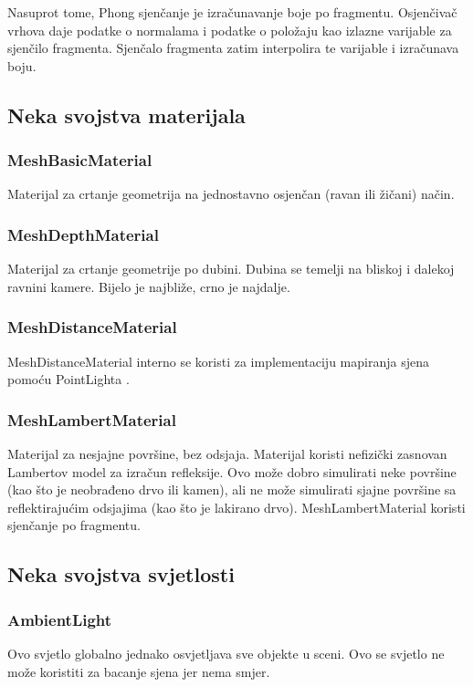 \documentclass[a4paper,12pt]{article}
\begin{document}
Nasuprot tome, Phong sjenčanje je izračunavanje boje po fragmentu. 
Osjenčivač vrhova daje podatke o normalama i podatke o položaju kao izlazne varijable za sjenčilo fragmenta. 
Sjenčalo fragmenta zatim interpolira te varijable i izračunava boju.

\subsection*{Neka svojstva materijala}
\subsubsection*{MeshBasicMaterial}

\hspace{10mm} Materijal za crtanje geometrija na jednostavno osjenčan (ravan ili žičani) način.

\subsubsection*{MeshDepthMaterial}
\hspace{10mm} Materijal za crtanje geometrije po dubini. Dubina se temelji na bliskoj i dalekoj ravnini kamere. Bijelo je najbliže, crno je najdalje.

\subsubsection*{MeshDistanceMaterial}
\hspace{10mm} MeshDistanceMaterial interno se koristi za implementaciju mapiranja sjena pomoću PointLighta .

\subsubsection*{MeshLambertMaterial}
Materijal za nesjajne površine, bez odsjaja.
Materijal koristi nefizički zasnovan Lambertov model za izračun refleksije. Ovo može dobro simulirati neke površine (kao što je neobrađeno drvo ili kamen), ali ne može simulirati sjajne površine sa reflektirajućim odsjajima (kao što je lakirano drvo). MeshLambertMaterial koristi sjenčanje po fragmentu.

\pagebreak
\subsection*{Neka svojstva svjetlosti}
\subsubsection*{AmbientLight}
\hspace{10mm} Ovo svjetlo globalno jednako osvjetljava sve objekte u sceni.
Ovo se svjetlo ne može koristiti za bacanje sjena jer nema smjer.
\end{document}
